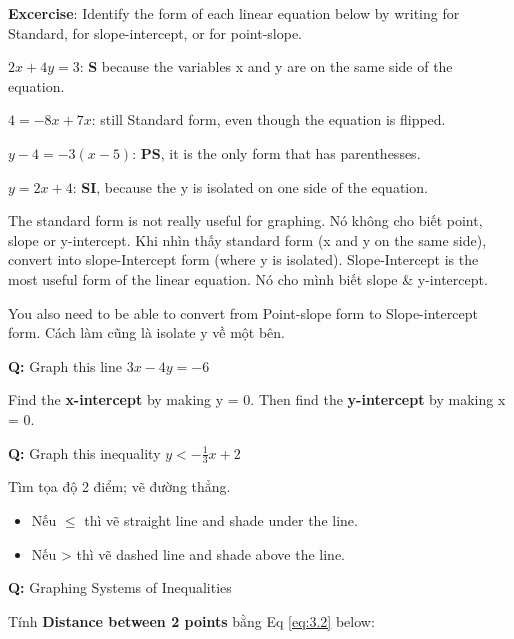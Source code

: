 \textbf{Excercise}: Identify the form of each linear equation below by writing  for Standard,  for slope-intercept, or  for point-slope.

$2x+4y=3$: \textbf{S} because the variables x and y are on the same side of the equation.

$4=-8x+7x$: still Standard form, even though the equation is flipped.

$y-4=-3(x-5)$: \textbf{PS}, it is the only form that has parenthesses.

$y=2x+4$: \textbf{SI}, because the y is isolated on one side of the equation.


\vspace{.6cm}

The standard form is not really useful for graphing. Nó không cho biết point, slope or y-intercept. Khi nhìn thấy standard form (x and y on the same side), convert into slope-Intercept form (where y is isolated). Slope-Intercept is the most useful form of the linear equation. Nó cho mình biết slope \& y-intercept.

You also need to be able to convert from Point-slope form to Slope-intercept form. Cách làm cũng là isolate y về một bên.


\vspace{2 cm}

\textbf{Q:} Graph this line \(3x-4y=-6\)

Find the \textbf{x-intercept} by making y = 0. Then find the \textbf{y-intercept} by making x = 0.

\vspace{5mm}

\textbf{Q:} Graph this inequality \(y < -\frac{1}{3}x+2\)

Tìm tọa độ 2 điểm; vẽ đường thẳng.

\begin{itemize}
  \item Nếu \(\le\) thì vẽ straight line and shade under the line.
  \item Nếu > thì vẽ dashed line and shade above the line.
\end{itemize}

\textbf{Q: }Graphing Systems of Inequalities

\vspace{5mm}

Tính \textbf{Distance between 2 points} bằng Eq \ref{eq:3.2} below:


